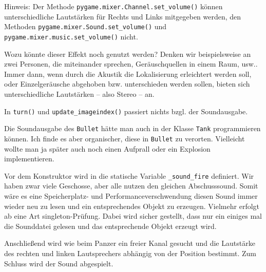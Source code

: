 Hinweis: Der Methode \texttt{pygame.mixer.Channel\-.set\-\_vol\-ume()} können unterschiedliche Lautstärken für Rechts und Links mitgegeben werden, den Methoden \texttt{pygame.mix\-er\-.Sound\-.set\-\_vol\-ume()} und \texttt{pygame.mixer.music\-.set\-\_vol\-ume()} nicht.


Wozu könnte dieser Effekt noch genutzt werden? Denken wir beispielsweise an zwei Personen, die miteinander sprechen, Geräuschquellen in einem Raum, usw.. Immer dann, wenn durch die Akustik die Lokalisierung erleichtert werden soll, oder Einzelgeräusche abgehoben bzw. unterschieden werden sollen, bieten sich unterschiedliche Lautstärken -- also Stereo -- an.

In \texttt{turn()} und \texttt{update\_imageindex()} passiert nichts bzgl. der Soundausgabe.


Die Soundausgabe des \texttt{Bullet} hätte man auch in der Klasse \texttt{Tank} programmieren können. Ich finde es aber organischer, diese in \texttt{Bullet} zu verorten. Vielleicht wollte man ja später auch noch einen Aufprall oder ein Explosion implementieren.

Vor dem Konstruktor wird in  die statische Variable \texttt{\_sound\_fire} definiert. Wir haben zwar viele Geschosse, aber alle nutzen den gleichen Abschusssound. Somit wäre es eine Speicherplatz- und Performanceverschwendung diesen Sound immer wieder neu zu lesen und ein entsprechendes Objekt zu erzeugen. Vielmehr erfolgt ab  eine Art \gls{singleton}-Prüfung. Dabei wird sicher gestellt, dass nur ein einiges mal die Sounddatei gelesen und das entsprechende Objekt erzeugt wird.

Anschließend wird wie beim Panzer ein freier Kanal gesucht und die Lautstärke des rechten und linken Lautsprechers abhängig von der Position bestimmt. Zum Schluss wird der Sound abgespielt.

\newpage
{} 

